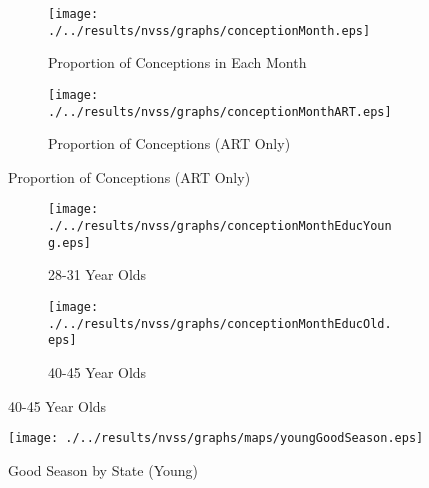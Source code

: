 \begin{figure}[htpb!]
\begin{center}
\caption{Age and Conception Month}
\label{bqFig:concepMonth}
\begin{subfigure}{.5\textwidth}
  \centering
  \texttt{[image: ./../results/nvss/graphs/conceptionMonth.eps]}
  \caption{Proportion of Conceptions in Each Month}
  \label{fig:concepAbs}
\end{subfigure}%
\begin{subfigure}{.5\textwidth}
  \centering
  \texttt{[image: ./../results/nvss/graphs/conceptionMonthART.eps]}
  \caption{Proportion of Conceptions (ART Only)}
  \label{fig:concepAbsART}
\end{subfigure}
\end{center}
\end{figure}

\begin{figure}[htpb!]
\begin{center}
\caption{Education and Conception Month}
\label{bqFig:concepEduc}
\begin{subfigure}{.5\textwidth}
  \centering
  \texttt{[image: ./../results/nvss/graphs/conceptionMonthEducYoung.eps]}
  \caption{28-31 Year Olds}
  \label{fig:educYoung}
\end{subfigure}%
\begin{subfigure}{.5\textwidth}
  \centering
  \texttt{[image: ./../results/nvss/graphs/conceptionMonthEducOld.eps]}
  \caption{40-45 Year Olds}
  \label{fig:educOld}
\end{subfigure}
\end{center}
\end{figure}


\begin{figure}[htpb!]
\begin{center}
  \centering
  \caption{Good Season by State (Young)}
  \texttt{[image: ./../results/nvss/graphs/maps/youngGoodSeason.eps]}
  \label{fig:mapYoung}
\end{center}
\end{figure}

